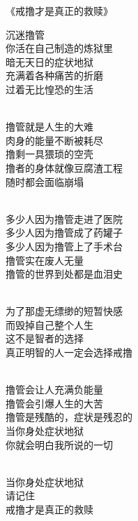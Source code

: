 \documentclass{ctexart}
\begin{document}
\begin{center}
    《戒撸才是真正的救赎》\it
    \begin{multicols}{2}
        沉迷撸管 \\ 你活在自己制造的炼狱里 \\ 暗无天日的症状地狱 \\ 充满着各种痛苦的折磨 \\ 过着无比惶恐的生活

        ~\\

        撸管就是人生的大难 \\ 肉身的能量不断被耗尽 \\ 撸剩一具猥琐的空壳 \\ 撸者的身体就像豆腐渣工程 \\ 随时都会面临崩塌

        ~\\

        多少人因为撸管走进了医院 \\ 多少人因为撸管成了药罐子 \\ 多少人因为撸管上了手术台 \\ 撸管实在废人无量 \\ 撸管的世界到处都是血泪史

        ~\\

        为了那虚无缥缈的短暂快感 \\ 而毁掉自己整个人生 \\ 这不是智者的选择 \\ 真正明智的人一定会选择戒撸

        ~\\

        撸管会让人充满负能量 \\ 撸管会引爆人生的大苦 \\ 撸管是残酷的，症状是残忍的 \\ 当你身处症状地狱 \\ 你就会明白我所说的一切

        ~\\

        当你身处症状地狱 \\ 请记住 \\ 戒撸才是真正的救赎
    \end{multicols}
\end{center}
\end{document}
